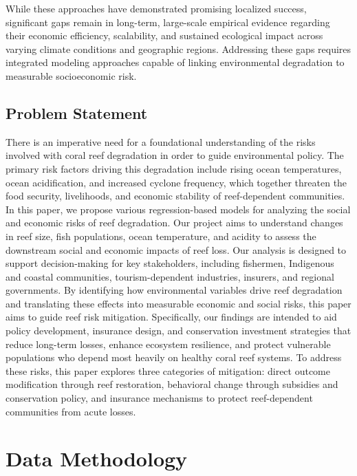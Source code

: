 \documentclass[10pt,letterpaper]{article}
\newcounter{gs}
\begin{document}
While these approaches have demonstrated promising localized success, significant gaps remain in long-term, large-scale empirical evidence regarding their economic efficiency, scalability, and sustained ecological impact across varying climate conditions and geographic regions. Addressing these gaps requires integrated modeling approaches capable of linking environmental degradation to measurable socioeconomic risk.

\subsection{Problem Statement}

There is an imperative need for a foundational understanding of the risks involved with coral reef degradation in order to guide environmental policy. The primary risk factors driving this degradation include rising ocean temperatures, ocean acidification, and increased cyclone frequency, which together threaten the food security, livelihoods, and economic stability of reef-dependent communities. In this paper, we propose various regression-based models for analyzing the social and economic risks of reef degradation. Our project aims to understand changes in reef size, fish populations, ocean temperature, and acidity to assess the downstream social and economic impacts of reef loss. Our analysis is designed to support decision-making for key stakeholders, including fishermen, Indigenous and coastal communities, tourism-dependent industries, insurers, and regional governments.
	By identifying how environmental variables drive reef degradation and translating these effects into measurable economic and social risks, this paper aims to guide reef risk mitigation. Specifically, our findings are intended to aid policy development, insurance design, and conservation investment strategies that reduce long-term losses, enhance ecosystem resilience, and protect vulnerable populations who depend most heavily on healthy coral reef systems. To address these risks, this paper explores three categories of mitigation: direct outcome modification through reef restoration, behavioral change through subsidies and conservation policy, and insurance mechanisms to protect reef-dependent communities from acute losses.
    
\section{Data Methodology}
\end{document}

